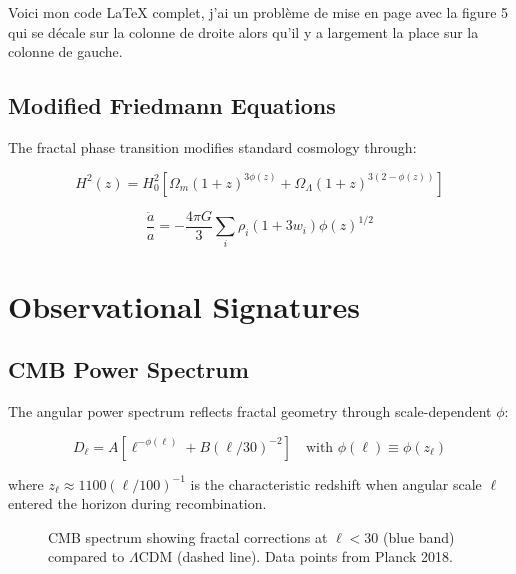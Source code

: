 Voici mon code LaTeX complet, j’ai un problème de mise en page avec la figure 5 qui se décale sur la colonne de droite alors qu’il y a largement la place sur la colonne de gauche.  \documentclass[aps,prl,twocolumn,groupedaddress]{revtex4-2}
\begin{document}
\subsection{Modified Friedmann Equations}
The fractal phase transition modifies standard cosmology through:

\begin{equation}
H^2(z) = H_0^2\left[\Omega_m(1+z)^{3\phi(z)} + \Omega_\Lambda(1+z)^{3(2-\phi(z))}\right]
\end{equation}

\begin{equation}
\frac{\ddot{a}}{a} = -\frac{4\pi G}{3}\sum_i \rho_i(1+3w_i)\phi(z)^{1/2}
\end{equation}

\section{Observational Signatures}

\subsection{CMB Power Spectrum}
The angular power spectrum reflects fractal geometry through scale-dependent $\phi$:

\begin{equation}
D_\ell = A\left[\ell^{-\phi(\ell)} + B(\ell/30)^{-2}\right]
\quad \text{with } \phi(\ell) \equiv \phi(z_\ell)
\end{equation}

where $z_\ell \approx 1100(\ell/100)^{-1}$ is the characteristic redshift when angular scale $\ell$ entered the horizon during recombination.

\begin{figure}[htbp]
\centering
{}
\caption{CMB spectrum showing fractal corrections at $\ell<30$ (blue band) compared to $\Lambda$CDM (dashed line). Data points from Planck 2018.}
\end{figure}
\end{document}
